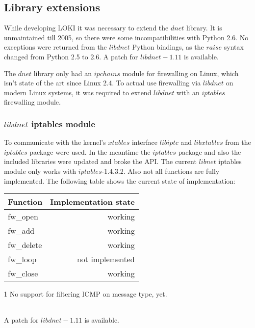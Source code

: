 \documentclass[a4paper, 11pt]{article}
\begin{document}
        \subsection{Library extensions}

        While developing LOKI it was necessary to extend the $dnet$ library. It is unmaintained till 2005, so there were some incompatibilities with Python 2.6. No exceptions were returned from the $libdnet$ Python bindings, as the $raise$ syntax changed from Python 2.5 to 2.6. A patch for $libdnet-1.11$ is available.

        The $dnet$ library only had an $ipchains$ module for firewalling on Linux, which isn't state of the art since Linux 2.4. To actual use firewalling via $libdnet$ on modern Linux systems, it was required to extend $libdnet$ with an $iptables$ firewalling module.

        \subsubsection{$libdnet$ iptables module}
        
            To communicate with the kernel's $xtables$ interface $libiptc$ and $libxtables$ from the $iptables$ package were used. In the meantime the $iptables$ package and also the included libraries were updated and broke the API. The current $libnet$ iptables module only works with $iptables$-1.4.3.2. Also not all functions are fully implemented. The following table shows the current state of implementation:
            \\
            
            \begin{threeparttable}
                \begin{tabular}{|l|r|}
                    \hline
                    Function & Implementation state\\
                    \hline
                    \hline
                    fw\_open & working\\
                    fw\_add & working\tnote{1}\\
                    fw\_delete & working\\
                    fw\_loop & not implemented\\
                    fw\_close & working\\
                    \hline
                \end{tabular}
                \begin{tablenotes}\footnotesize 
                    \item[1] No support for filtering ICMP on message type, yet.
                \end{tablenotes}
            \end{threeparttable}
            \\

            A patch for $libdnet-1.11$ is available.
\end{document}
